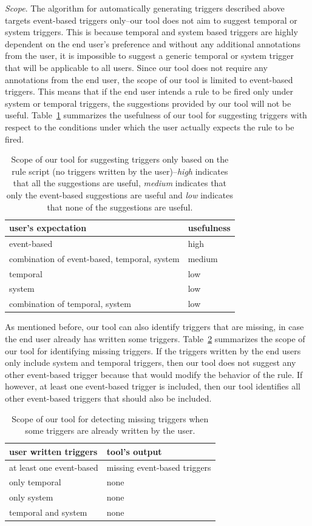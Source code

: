 \documentclass{sig-alternate-05-2015}
\begin{document}
\emph{Scope}. The algorithm for automatically generating triggers described above targets event-based triggers only--our tool does not aim to suggest temporal or system triggers. This is because temporal and system based triggers are highly dependent on the end user's preference and without any additional annotations from the user, it is impossible to suggest a generic temporal or system trigger that will be applicable to all users. Since our tool does not require any annotations from the end user, the scope of our tool is limited to event-based triggers. This means that if the end user intends a rule to be fired only under system or temporal triggers, the suggestions provided by our tool will not be useful. Table~\ref{tab:scope1} summarizes the usefulness of our tool for suggesting triggers with respect to the conditions under which the user actually expects the rule to be fired.
\begin{table}[h]
\centering
\begin{tabular}{|l|l|}
\hline
user's expectation & usefulness \\ \hline
event-based & high \\ \hline
combination of event-based, temporal, system  & medium \\ \hline
temporal & low \\\hline
system & low \\ \hline
combination of temporal, system & low  \\ \hline
\end{tabular}
\caption{Scope of our tool for suggesting triggers only based on the rule script (no triggers written by the user)--\textit{high} indicates that all the suggestions are useful, \textit{medium} indicates that only the event-based suggestions are useful and \textit{low} indicates that none of the suggestions are useful. }
\label{tab:scope1}
\end{table}

As mentioned before, our tool can also identify triggers that are missing, in case the end user already has written some triggers. Table~\ref{tab:scope2} summarizes the scope of our tool for identifying missing triggers. If the triggers written by the end users only include system and temporal triggers, then our tool does not suggest any other event-based trigger because that would modify the behavior of the rule. If however, at least one event-based trigger is included, then our tool identifies all other event-based triggers that should also be included. 
\begin{table}[h]
\centering
\begin{tabular}{|l|l|}
\hline
user written triggers & tool's output \\ \hline
at least one event-based & missing event-based triggers \\ \hline
only temporal & none \\\hline
only system & none \\ \hline
temporal and system & none  \\ \hline
\end{tabular}
\caption{Scope of our tool for detecting missing triggers when some triggers are already written by the user.}
\label{tab:scope2}
\end{table}
\end{document}
